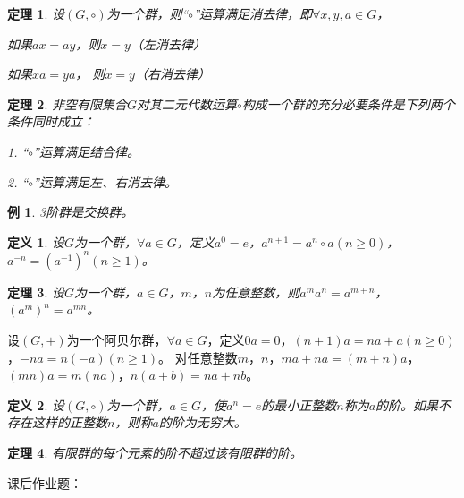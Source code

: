 \documentclass{article}
\newtheorem{Def}{定义}
\newtheorem{Thm}{定理}
\newtheorem*{Example}{例}
\begin{document}
\begin{CJK*}{UTF8}{gbsn}
\begin{Thm}
  设$(G,\circ)$为一个群，则“$\circ$”运算满足消去律，即$\forall x, y, a\in G$，

  如果$ax = ay$，则$x=y$（左消去律）

  如果$xa = ya$， 则$x=y$（右消去律）
\end{Thm}

\begin{Thm}
  非空有限集合$G$对其二元代数运算$\circ$构成一个群的充分必要条件是下列两个条件同时成立：

  1. “$\circ$”运算满足结合律。

  2. “$\circ$”运算满足左、右消去律。
\end{Thm}
\begin{Example}
  3阶群是交换群。
\end{Example}
\begin{Def}
  设$G$为一个群，$\forall a\in G$，定义$a^0=e$，$a^{n+1}=a^n\circ a$$(n\geq 0)$，$a^{-n}=(a^{-1})^n$$(n\geq 1)$。
\end{Def}
\begin{Thm}
设$G$为一个群，$a\in G$，$m$，$n$为任意整数，则$a^ma^n=a^{m+n}$，$(a^m)^n=a^{mn}$。
\end{Thm}
设$(G,+)$为一个阿贝尔群，$\forall a\in G$，定义$0a=0$，$(n+1)a=na+a$$(n\geq 0)$，$-na=n(-a)$$(n\geq 1)$。
对任意整数$m$，$n$，$ma+na=(m+n)a$，$(mn)a=m(na)$，$n(a+b)=na+nb$。
\begin{Def}
  设$(G,\circ)$为一个群，$a\in G$，使$a^n=e$的最小正整数$n$称为$a$的阶。如果不存在这样的正整数$n$，则称$a$的阶为无穷大。
\end{Def}
\begin{Thm}
  有限群的每个元素的阶不超过该有限群的阶。
\end{Thm}

课后作业题：


\end{CJK*}
\end{document}
